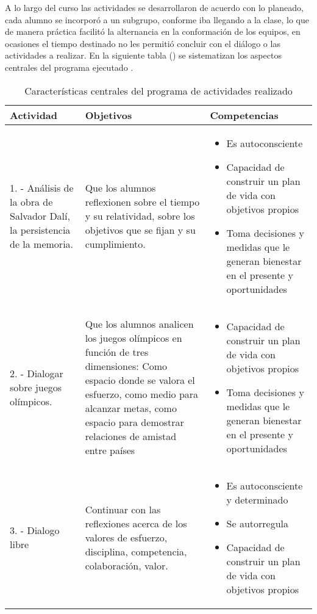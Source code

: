 \documentclass[spanish]{textolivre}
\begin{document}
A lo largo del curso las actividades se desarrollaron de acuerdo con lo planeado, cada alumno se incorporó a un subgrupo, conforme iba llegando a la clase, lo que de manera práctica facilitó la alternancia en la conformación de los equipos, en ocasiones el tiempo destinado no les permitió concluir con el diálogo o las actividades a realizar. En la siguiente tabla () se sistematizan los aspectos centrales del programa ejecutado \cite{mikulic2015}.

\begin{longtable}{p{}p{}p{}}
\caption{Características centrales del programa de actividades realizado}
\label{tab1}
\\
\toprule
Actividad & Objetivos & Competencias 
\\
\midrule
\arrayrulecolor[gray]{.7}
1. - Análisis de la obra de Salvador Dalí, la persistencia de la memoria. & Que los alumnos reflexionen sobre el tiempo y su relatividad, sobre los objetivos que se fijan y su cumplimiento. & \begin{itemize}
\item Es autoconsciente
\item Capacidad de construir un plan de vida con objetivos propios
\item Toma decisiones y medidas que le generan bienestar en el presente y oportunidades
\end{itemize} 
\\
\midrule
2. - Dialogar sobre juegos olímpicos. & Que los alumnos analicen los juegos olímpicos en función de tres dimensiones: Como espacio donde se valora el esfuerzo, como medio para alcanzar metas, como espacio para demostrar relaciones de amistad entre países &
\begin{itemize}
\item Capacidad de construir un plan de vida con objetivos propios
\item Toma decisiones y medidas que le generan bienestar en el presente y oportunidades
\end{itemize}
\\
\midrule
3. - Dialogo libre & Continuar con las reflexiones acerca de los valores de esfuerzo, disciplina, competencia, colaboración, valor. &
\begin{itemize}
\item Es autoconsciente y determinado 
\item Se autorregula
\item Capacidad de construir un plan de vida con objetivos propios

\end{itemize}
\end{longtable}
\end{document}
